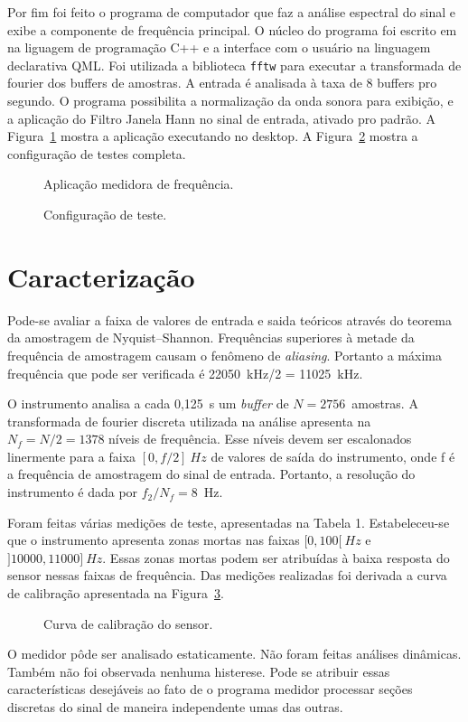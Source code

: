 \documentclass[a4paper,9pt,twocolumn]{article}
\newcommand{\fig}[4][ht!]{
  \begin{figure}[#1]
    {\centering{\texttt{[image: \#2]}}\par}
    \caption{#3}
    \label{fig:#2}
  \end{figure}
}
\begin{document}
Por fim foi feito o programa de computador que faz a análise espectral do sinal e exibe a componente de frequência principal. 
O núcleo do programa foi escrito em na liguagem de programação C++ e a interface com o usuário na linguagem declarativa QML.
Foi utilizada a biblioteca \texttt{fftw} para executar a transformada de fourier dos buffers de amostras. A entrada é analisada
à taxa de 8 buffers pro segundo. O programa possibilita a normalização da onda sonora para exibição, e a aplicação do Filtro Janela 
Hann no sinal de entrada, ativado pro padrão. A Figura~\ref{fig:app1} mostra a aplicação executando no desktop. A Figura~\ref{fig:setup} 
mostra a configuração de testes completa.

\fig{app1}{Aplicação medidora de frequência.}{width=0.8\columnwidth}

\fig{setup}{Configuração de teste.}{width=\columnwidth}

\section{Caracterização}
Pode-se avaliar a faixa de valores de entrada e saida teóricos através do teorema da amostragem de Nyquist–Shannon. Frequências superiores à 
metade da frequência de amostragem causam o fenômeno de \emph{aliasing}. Portanto a máxima frequência que pode ser verificada é 22050~kHz/2 = 11025~kHz.

O instrumento analisa a cada 0,125~s um \emph{buffer} de $N=2756$~amostras. A transformada de fourier discreta utilizada na análise apresenta na 
$N_f = N/2 = 1378$ níveis de frequência. Esse níveis devem ser escalonados linermente para a faixa $[0, f/2]~Hz$ de valores de saída do instrumento, onde f é a frequência de amostragem
do sinal de entrada. Portanto, a resolução do instrumento é dada por $f_2/N_f = 8$~Hz. 

Foram feitas várias medições de teste, apresentadas na Tabela 1. Estabeleceu-se que o instrumento apresenta zonas mortas nas 
faixas $[0, 100[~Hz$ e $]10000, 11000]~Hz$. Essas zonas mortas podem ser atribuídas à baixa resposta do sensor nessas faixas de frequência.
Das medições realizadas foi derivada a curva de calibração apresentada na Figura~\ref{fig:data}. 

\fig{data}{Curva de calibração do sensor.}{width=\columnwidth}

O medidor pôde ser analisado estaticamente. Não foram feitas análises dinâmicas. Também não foi observada nenhuma histerese. Pode se 
atribuir essas características desejáveis ao fato de o programa medidor processar seções discretas do sinal de maneira independente umas das outras.
\end{document}
